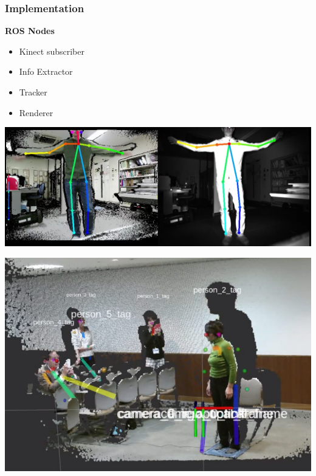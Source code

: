 \documentclass[xcolor=pdftex,dvipsnames,table]{beamer}
\begin{document}
\begin{frame}
  \frametitle{Implementation}

  {\large\textbf{ROS Nodes}}

  \begin{itemize}
  \item Kinect subscriber \pause
  \item Info Extractor \pause
  \item Tracker \pause
  \item Renderer \pause
  \end{itemize}
  
\end{frame}


\begin{frame}
    \includegraphics[width=\linewidth]{graphics/rgb_lag}
  \end{frame}

\begin{frame}

    \includegraphics[width=\linewidth]{graphics/tags}

\end{frame}
\end{document}

